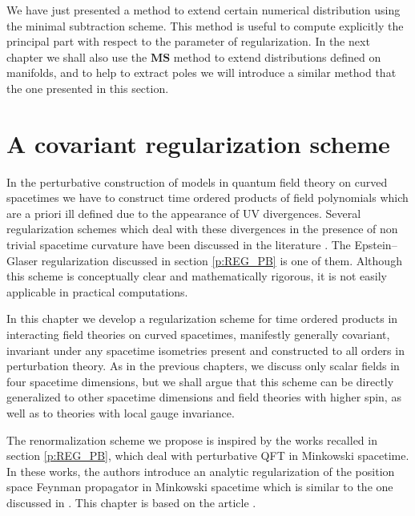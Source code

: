 \documentclass[11pt]{book}
\newcommand{\MS}{\textbf{MS}}
\theoremstyle{break}
\begin{document}
\bigskip


We have just presented a method to extend certain numerical distribution using the minimal subtraction scheme. This method is useful to compute explicitly the principal part with respect to the parameter of regularization. In the next chapter we shall also use the $\MS$ method to extend distributions defined on manifolds, and to help to extract poles we will introduce a similar method that the one presented in this section.


\chapter{A covariant regularization scheme}
\label{p:COV_REG}


In the perturbative construction of models in quantum field theory on curved spacetimes we have to construct time ordered products of field polynomials which are a priori ill defined due to the appearance of UV divergences. Several regularization schemes which deal with these divergences in the presence of non trivial spacetime curvature have been discussed in the literature \cite{BUNCH_1981,LUSCHER_1982,TOMS_1982,CHL_1995,PRANGE_1999,BILAL_2013,BF_2000,HW_2001,HW_2005,HOLLANDS_2010,BCK_2010}. The Epstein--Glaser regularization discussed in section \ref{p:REG_PB} is one of them. Although this scheme is conceptually clear and mathematically rigorous, it is not easily applicable in practical computations.\par%


In this chapter we develop a regularization scheme for time ordered products in interacting field theories on curved spacetimes, manifestly generally covariant, invariant under any spacetime isometries present and constructed to all orders in perturbation theory.  As in the previous chapters, we discuss only scalar fields in four spacetime dimensions, but we shall argue that this scheme can be directly generalized to other spacetime dimensions and field theories with higher spin, as well as to theories with local gauge invariance.\par%


The renormalization scheme we propose is inspired by the works \cite{KELLER_2010,DFKR_2014} recalled in section \ref{p:REG_PB}, which deal with perturbative QFT in Minkowski spacetime. In these works, the authors introduce an analytic regularization of the position space Feynman propagator in Minkowski spacetime which is similar to the one discussed in \cite{BG_1972}. This chapter is based on the article \cite{GHP_2015}.\par%
\end{document}
